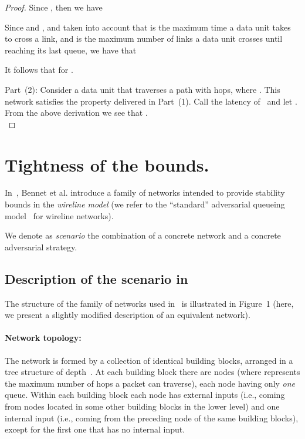 \documentclass[journal,twocolumn]{./IEEEtran}
\begin{document}
\begin{proof}
Since , then we have



Since   and ,
and taken into account that  is the maximum time a data unit takes to cross a link, and  is the maximum number of links a data unit crosses until reaching its last queue, we have that

It follows that  for .


Part~(2): Consider a data unit  that traverses a path with  hops, where . This network satisfies the 
property delivered in
Part~(1). 
Call  
the 
latency
of~ and let . 
From the above derivation we see that 
. \\
\end{proof}



\section{Tightness of the bounds.}



In~\cite{DBLP:journals/ton/BennettBCCB02}, Bennet et al. introduce a family of networks  intended to provide stability bounds in the \emph{wireline model} (we refer to the ``standard'' adversarial queueing model~\cite{aafkll01} for wireline networks). 

We denote as \emph{scenario} the combination of a concrete network and a concrete adversarial strategy.


\subsection{Description of the scenario in~\cite{DBLP:journals/ton/BennettBCCB02}}
\label{subsec:scenario}

The structure of the family of networks used in~\cite{DBLP:journals/ton/BennettBCCB02} is illustrated in Figure~1 (here, we present a slightly modified description of an equivalent network).


\paragraph{Network topology:}

The network is formed by a collection of identical building blocks, arranged in a tree structure of depth~. At each building block there are  nodes (where  represents the maximum number of hops a packet can traverse), each node having only \emph{one} queue.  Within each building block each node has  external inputs (i.e., coming from nodes located in some other building blocks in the lower level) and one internal input (i.e., coming from the preceding node of the same building blocks), except for the first one that has no internal input.
\end{document}
